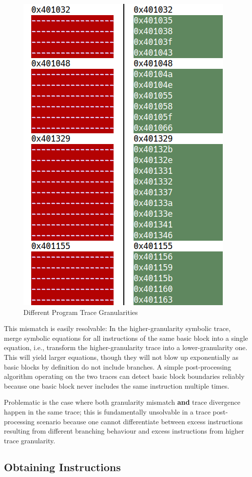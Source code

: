 \begin{figure}[htb]
    \centering
    \includegraphics[width=0.5\linewidth]{figures/trace_diff_view.png}
    \caption{Different Program Trace Granularities}\label{fig:trace_granularity}
\end{figure}

This mismatch is easily resolvable: In the higher-granularity symbolic trace, merge symbolic equations for all
instructions of the same basic block into a single equation, i.e., transform the higher-granularity trace into a
lower-granularity one. This will yield larger equations, though they will not blow up exponentially as basic blocks by
definition do not include branches. A simple post-processing algorithm operating on the two traces can detect basic
block boundaries reliably because one basic block never includes the same instruction multiple times.

Problematic is the case where both granularity mismatch \textbf{and} trace divergence happen in the same trace; this is
fundamentally unsolvable in a trace post-processing scenario because one cannot differentiate between excess
instructions resulting from different branching behaviour and excess instructions from higher trace granularity.

\subsection{Obtaining Instructions}

